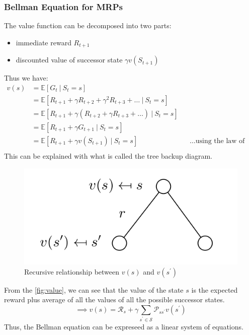 \subsubsection{Bellman Equation for MRPs}
The value function can be decomposed into two parts:
\begin{itemize}
    \item immediate reward \(R_{t+1}\)
    \item discounted value of successor state \(\gamma v(S_{t+1})\)
\end{itemize}
Thus we have:
\[
    \begin{aligned}
        v(s) & = \mathbb{E}  [ G_{t} \ |\  S_{t} = s] \\
             & = \mathbb{E}  [ R_{t+1} + \gamma R_{t+2} + \gamma^{2} R_{t+3} + \dots \ |\  S_{t} = s] \\
             & = \mathbb{E}  [ R_{t+1} + \gamma (R_{t+2} + \gamma R_{t+3} + \dots) \ |\  S_{t} = s] \\
             & = \mathbb{E}  [ R_{t+1} + \gamma G_{t+1} \ |\  S_{t} = s] \\
             & = \mathbb{E}  [ R_{t+1} + \gamma v(S_{t+1}) \ |\  S_{t} = s] &&\dots \text{using the law of iterated expectations} \\ 
    \end{aligned}
\]
This can be explained with what is called the tree backup diagram.
\begin{figure}[H]
    \centering
    \includegraphics[width=0.5\linewidth]{figures/value.png}
    \caption{Recursive relationship between \(v(s)\) and \(v(s^{\prime} )\)}
    \label{fig:value}
\end{figure}
From the \autoref{fig:value}, we can see that the value of the state \(s\) is the
expected reward plus average of all the values of all the possible successor states.
\[
    \implies v(s) = \mathcal{R} _{s} + \gamma \sum_{s^{\prime} \in \mathcal{S} } \mathcal{P} _{ss^{\prime}} v(s^{\prime})
\]
Thus, the Bellman equation can be expreseed as a linear system of equations.
